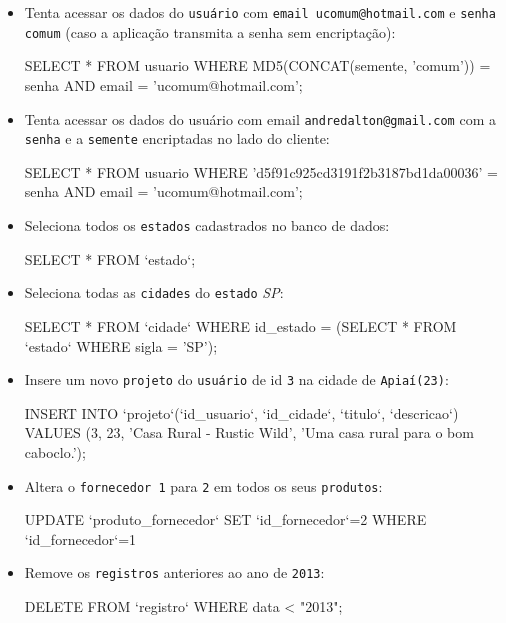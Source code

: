 \documentclass[12pt,a4paper]{article}
\begin{document}
\begin{itemize}
\item Tenta acessar os dados do \verb+usuário+ com \verb+email ucomum@hotmail.com+ e \verb+senha comum+ (caso a aplicação transmita a senha sem encriptação):
\begin{code}
SELECT * FROM usuario
WHERE
    MD5(CONCAT(semente, 'comum')) = senha
    AND email = 'ucomum@hotmail.com';
\end{code}

\item Tenta acessar os dados do usuário com email \verb+andredalton@gmail.com+ com a \verb+senha+ e a \verb+semente+ encriptadas no lado do cliente:
\begin{code}
SELECT * FROM usuario
WHERE
    'd5f91c925cd3191f2b3187bd1da00036' = senha
    AND email = 'ucomum@hotmail.com';
\end{code}

\item Seleciona todos os \verb+estados+ cadastrados no banco de dados:
\begin{code}
SELECT * FROM `estado`;
\end{code}

\item Seleciona todas as \verb+cidades+ do \verb+estado+ \emph{SP}:
\begin{code}
SELECT * FROM `cidade`
WHERE id_estado = (SELECT * FROM `estado` WHERE sigla = 'SP');
\end{code}

\item Insere um novo \verb+projeto+ do \verb+usuário+ de id \verb+3+ na cidade de \verb+Apiaí(23)+:
\begin{code}
INSERT INTO `projeto`(`id_usuario`, `id_cidade`, `titulo`, `descricao`)
VALUES
    (3, 23, 'Casa Rural - Rustic Wild', 'Uma casa rural para o bom caboclo.');
\end{code}

\item Altera o \verb+fornecedor 1+ para \verb+2+ em todos os seus \verb+produtos+:
\begin{code}
UPDATE `produto_fornecedor`
SET `id_fornecedor`=2 WHERE `id_fornecedor`=1
\end{code}

\item Remove os \verb+registros+ anteriores ao ano de \verb+2013+:
\begin{code}
DELETE FROM `registro` WHERE data < "2013";
\end{code}


\end{itemize}
\end{document}
